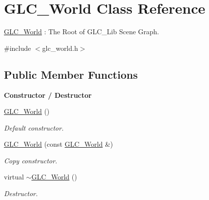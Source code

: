 \hypertarget{class_g_l_c___world}{\section{G\-L\-C\-\_\-\-World Class Reference}
\label{class_g_l_c___world}
}


\hyperlink{class_g_l_c___world}{G\-L\-C\-\_\-\-World} \-: The Root of G\-L\-C\-\_\-\-Lib Scene Graph.  




{\ttfamily \#include $<$glc\-\_\-world.\-h$>$}

\subsection*{Public Member Functions}
\begin{Indent}{\bf Constructor / Destructor}\par
\begin{DoxyCompactItemize}
\item 
\hyperlink{class_g_l_c___world_abc1647e4328ef9b5b286ec0a0d70251e}{G\-L\-C\-\_\-\-World} ()
\begin{DoxyCompactList}\small\item\em Default constructor. \end{DoxyCompactList}\item 
\hyperlink{class_g_l_c___world_a4dd7964a868121799523bb14fba40284}{G\-L\-C\-\_\-\-World} (const \hyperlink{class_g_l_c___world}{G\-L\-C\-\_\-\-World} \&)
\begin{DoxyCompactList}\small\item\em Copy constructor. \end{DoxyCompactList}\item 
virtual \hyperlink{class_g_l_c___world_a042b23d694b4d71c10fa53cf613be3bb}{$\sim$\-G\-L\-C\-\_\-\-World} ()
\begin{DoxyCompactList}\small\item\em Destructor. \end{DoxyCompactList}\end{DoxyCompactItemize}
\end{Indent}
